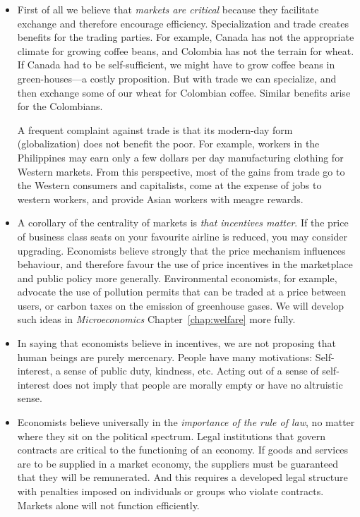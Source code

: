 \begin{itemize}
\item First of all we believe that \textit{markets are critical} because
they facilitate exchange and therefore encourage efficiency. Specialization and 
trade creates benefits for the trading parties. For example,
Canada has not the appropriate climate for growing coffee beans, and
Colombia has not the terrain for wheat. If Canada had to be self-sufficient,
we might have to grow coffee beans in green-houses---a costly proposition.
But with trade we can specialize, and then exchange some of our wheat for Colombian
coffee. Similar benefits arise for the Colombians.

\medskip
A frequent complaint against trade is that its modern-day form
(globalization) does not benefit the poor. For example, workers in the
Philippines may earn only a few dollars per day manufacturing clothing for
Western markets. From this perspective, most of the gains from trade go to
the Western consumers and capitalists, come at the expense of jobs to
western workers, and provide Asian workers with meagre rewards.  

\item A corollary of the centrality of markets is \textit{that incentives
matter}. If the price of business class seats on your favourite airline is
reduced, you may consider upgrading. Economists believe strongly that the
price mechanism influences behaviour, and therefore favour the use of price
incentives in the marketplace and public policy more generally.
Environmental economists, for example, advocate the use of pollution permits
that can be traded at a price between users, or carbon taxes on the emission
of greenhouse gases. We will develop such ideas in \textit{Microeconomics}
Chapter~\ref{chap:welfare} more fully.

\item In saying that economists believe in incentives, we are not proposing
that human beings are purely mercenary. People have many motivations:
Self-interest, a sense of public duty, kindness, etc. Acting out of a sense
of self-interest does not imply that people are morally empty or have no
altruistic sense. 

\item Economists believe universally in the \textit{importance of the rule
of law}, no matter where they sit on the political spectrum. Legal
institutions that govern contracts are critical to the functioning of an
economy. If goods and services are to be supplied in a market economy, the
suppliers must be guaranteed that they will be remunerated. And this
requires a developed legal structure with penalties imposed on individuals
or groups who violate contracts. Markets alone will not function efficiently.


\end{itemize}
